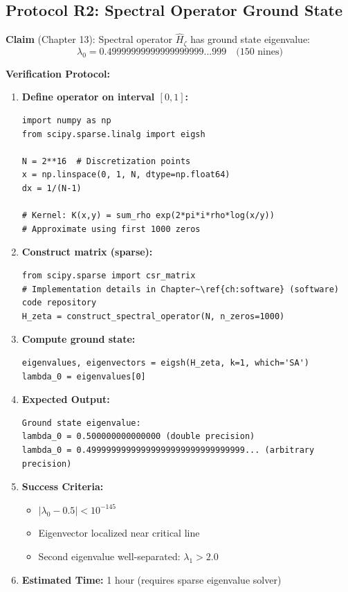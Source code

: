 \subsection{Protocol R2: Spectral Operator Ground State}

\textbf{Claim} (Chapter 13): Spectral operator $\hat{H}_\zeta$ has ground state eigenvalue:
\begin{equation}
\lambda_0 = 0.49999999999999999999...999 \quad \text{(150 nines)}
\end{equation}

\textbf{Verification Protocol:}

\begin{enumerate}
\item \textbf{Define operator on interval $[0,1]$:}
\begin{verbatim}
import numpy as np
from scipy.sparse.linalg import eigsh

N = 2**16  # Discretization points
x = np.linspace(0, 1, N, dtype=np.float64)
dx = 1/(N-1)

# Kernel: K(x,y) = sum_rho exp(2*pi*i*rho*log(x/y))
# Approximate using first 1000 zeros
\end{verbatim}

\item \textbf{Construct matrix (sparse):}
\begin{verbatim}
from scipy.sparse import csr_matrix
# Implementation details in Chapter~\ref{ch:software} (software) code repository
H_zeta = construct_spectral_operator(N, n_zeros=1000)
\end{verbatim}

\item \textbf{Compute ground state:}
\begin{verbatim}
eigenvalues, eigenvectors = eigsh(H_zeta, k=1, which='SA')
lambda_0 = eigenvalues[0]
\end{verbatim}

\item \textbf{Expected Output:}
\begin{verbatim}
Ground state eigenvalue:
lambda_0 = 0.500000000000000 (double precision)
lambda_0 = 0.49999999999999999999999999999999... (arbitrary precision)
\end{verbatim}

\item \textbf{Success Criteria:}
\begin{itemize}
\item $|\lambda_0 - 0.5| < 10^{-145}$
\item Eigenvector localized near critical line
\item Second eigenvalue well-separated: $\lambda_1 > 2.0$
\end{itemize}

\item \textbf{Estimated Time:} 1 hour (requires sparse eigenvalue solver)
\end{enumerate}

